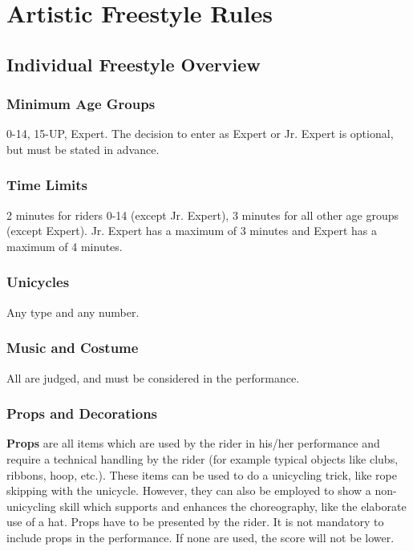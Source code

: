 \chapter{Artistic Freestyle Rules}

\section{Individual Freestyle Overview}

\subsection{Minimum Age Groups}
0-14, 15-UP, Expert.
The decision to enter as Expert or Jr. Expert is optional, but must be stated in advance.

\subsection{Time Limits}
2 minutes for riders 0-14 (except Jr. Expert), 3 minutes for all other age groups (except Expert).
Jr. Expert has a maximum of 3 minutes and Expert has a maximum of 4 minutes.

\subsection{Unicycles}
Any type and any number.

\subsection{Music and Costume}
All are judged, and must be considered in the performance.

\subsection{Props and Decorations \label{subsec:freestyle_freestyle-rules_individual-freestyle-overview_props-and-decorations}}

\textbf{Props} are all items which are used by the rider in his/her performance and require a technical handling by the rider (for example typical objects like clubs, ribbons, hoop, etc.). 
These items can be used to do a unicycling trick, like rope skipping with the unicycle.
However, they can also be employed to show a non-unicycling skill which supports and enhances the choreography, like the elaborate use of a hat.
Props have to be presented by the rider.
It is not mandatory to include props in the performance.
If none are used, the score will not be lower. 

